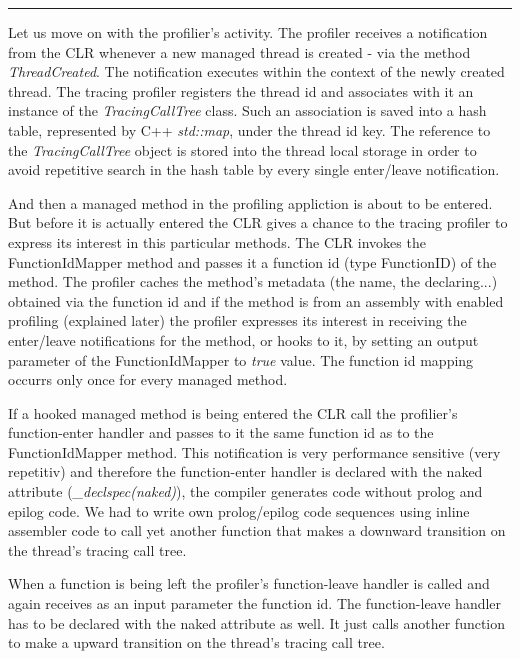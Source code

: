 \begin{center}
\rule{300pt}{1.5pt}
\end{center}
Let us move on with the profilier's activity. The profiler receives a notification from the CLR whenever a new managed thread is created - via the method \textit{ThreadCreated}. The notification executes within the context of the newly created thread. The tracing profiler registers the thread id and associates with it an instance of the \textit{TracingCallTree} class. Such an association is saved into a hash table, represented by C++ \textit{std::map}, under the thread id key. The reference to the \textit{TracingCallTree} object is stored into the thread local storage in order to avoid repetitive search in the hash table by every single enter/leave notification.

And then a managed method in the profiling appliction is about to be entered. But before it is actually entered the CLR gives a chance to the tracing profiler to express its interest in this particular methods. The CLR invokes the FunctionIdMapper method and passes it a function id (type FunctionID) of the method. The profiler caches the method's metadata (the name, the declaring...) obtained via the function id and if the method is from an assembly with enabled profiling (explained later) the profiler expresses its interest in receiving the enter/leave notifications for the method,  or hooks to it, by setting an output parameter of the FunctionIdMapper to \textit{true} value. The function id mapping occurrs only once for every managed method.

If a hooked managed method is being entered the CLR call the profilier's function-enter handler and passes to it the same function id as to the FunctionIdMapper method. This notification is very performance sensitive (very repetitiv) and therefore the function-enter handler is declared with the naked attribute (\textit{\_declspec(naked)}), the compiler generates code without prolog and epilog code. We had to write own prolog/epilog code sequences using inline assembler code to call yet another function that makes a downward transition on the thread's tracing call tree.

When a function is being left the profiler's function-leave handler is called and again receives as an input parameter the function id. The function-leave handler has to be declared with the naked attribute as well. It just calls another function to make a upward transition on the thread's tracing call tree.

